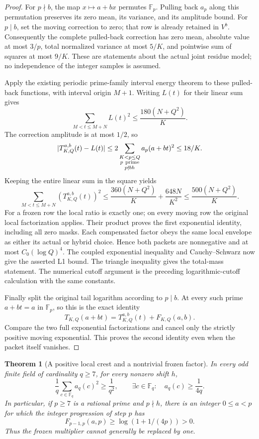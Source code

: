 \documentclass[11pt]{article}
\newtheorem{theorem}{Theorem}[section]
\begin{document}
\begin{proof}
For \(p\nmid b\), the map \(x\mapsto a+bx\) permutes \(\mathbb F_p\).
Pulling back \(a_p\) along this permutation preserves its zero mean,
its variance, and its amplitude bound. For \(p\mid b\), set the moving
correction to zero; that row is already retained in \(V^b\).
Consequently the complete pulled-back correction has zero mean,
absolute value at most \(3/p\), total normalized variance at most
\(5/K\), and pointwise sum of squares at most \(9/K\).
These are statements about the actual joint residue model; no
independence of the integer samples is assumed.

Apply the existing periodic prime-family interval energy theorem to
these pulled-back functions, with interval origin \(M+1\).
Writing \(L(t)\) for their linear sum gives
\[
            \sum_{M<t\leq M+N}L(t)^2
                         \leq\frac{180(N+Q^2)}K.
\]
The correction amplitude is at most \(1/2\), so
\[
 |T^{a,b}_{K,Q}(t)-L(t)|
 \leq2\sum_{\substack{K<p\leq Q\\p\ {\rm prime}\\p\nmid bh}}
                                  a_p(a+bt)^2
 \leq18/K.
\]
Keeping the entire linear sum in the square yields
\[
 \sum_{M<t\leq M+N}(T^{a,b}_{K,Q}(t))^2
 \leq\frac{360(N+Q^2)}K+\frac{648N}{K^2}
 \leq\frac{500(N+Q^2)}K.
\]
For a frozen row the local ratio is exactly one; on every moving row
the original local factorization applies. Their product proves the
first exponential identity, including all zero masks.
Each compensated factor obeys the same local envelope as either its
actual or hybrid choice. Hence both packets are nonnegative and at most
\(C_0(\log Q)^4\). The coupled exponential inequality and
Cauchy--Schwarz now give the asserted L1 bound.
The triangle inequality gives the total-mass statement.
The numerical cutoff argument is the preceding logarithmic-cutoff
calculation with the same constants.

Finally split the original tail logarithm according to \(p\mid b\).
At every such prime \(a+bt=a\) in \(\mathbb F_p\), so this is the exact
identity
\[
 T_{K,Q}(a+bt)=T^{a,b}_{K,Q}(t)+F_{K,Q}(a,b).
\]
Compare the two full exponential factorizations and cancel only the
strictly positive moving exponential. This proves the second identity
even when the packet itself vanishes.
\end{proof}

\begin{theorem}[A positive local crest and a nontrivial frozen factor]
\label{thm:positiveFrozenFactor}
In every odd finite field of cardinality \(q\geq7\), for every nonzero
shift \(h\),
\[
 \frac1q\sum_{c\in\mathbb F_q}a_q(c)^2\geq\frac1{q^2},
 \qquad
          \exists c\in\mathbb F_q:\quad a_q(c)\geq\frac1{4q}.
\]
In particular, if \(p\geq7\) is a rational prime and \(p\nmid h\),
there is an integer \(0\leq a<p\) for which the integer progression
of step \(p\) has
\[
 F_{p-1,p}(a,p)
 \geq\log(1+1/(4p))>0.
\]
Thus the frozen multiplier cannot generally be replaced by one.
\end{theorem}
\end{document}
